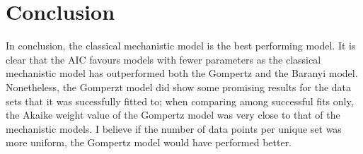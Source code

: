 \documentclass[11pt]{article}
\begin{document}
\section{Conclusion}
In conclusion, the classical mechanistic model is the best performing model. It is clear that the AIC favours models with fewer parameters as the classical mechanistic model has outperformed both the Gompertz and the Baranyi model. Nonetheless, the Gomperzt model did show some promising results for the data sets that it was sucessfully fitted to; when comparing among successful fits only, the Akaike weight value of the Gompertz model was very close to that of the mechanistic models. I believe if the number of data points per unique set was more uniform, the Gompertz model would have performed better.

\newpage



\end{document}
